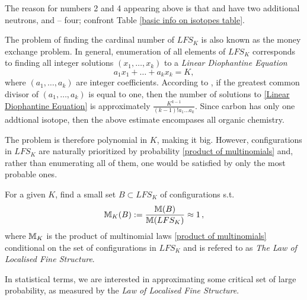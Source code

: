 The reason for numbers 2 and 4 appearing above is that  and  have two additional neutrons, and  -- four; confront Table \ref{basic info on isotopes table}.

The problem of finding the cardinal number of $LFS_K$ is also known as the money exchange problem. In general, enumeration of all elements of $LFS_K$ corresponds to finding all integer solutions $(x_1, \dots, x_k)$ to a {\it Linear Diophantine Equation}  
\begin{equation}\label{Linear Diophantine Equation}
	a_1 x_1 + \dots + a_k x_k = K,
\end{equation}
where $(a_1, \dots, a_k)$ are integer coefficients. According to \cite{Agnarsson2002OnTheSylvesterDenumerants}, if the greatest common divisor of $(a_1, \dots, a_k)$ is equal to one, then the number of solutions to \eqref{Linear Diophantine Equation} is approximately $\frac{K^{k-1}}{(k-1)! a_1 \dots a_k}$. Since carbon has only one addtional isotope, then the above estimate encompases all organic chemistry. 

The problem is therefore polynomial in $K$, making it big. However, configurations in $LFS_K$ are naturally prioritized by probability \eqref{product of multinomials} and, rather than enumerating all of them, one would be satisfied by only the most probable ones. 


\begin{Problem}\label{Problem of finding LFS_K configurations.}
	For a given $K$, find a small set $B \subset LFS_K$ of configurations s.t. 
	\begin{equation}\label{problem equation}
		\mathbb{M}_K (B) := \frac{ \mathbb{M}(B) }{ \mathbb{M}( LFS_K ) } \approx 1\,,	
	\end{equation} 
	where $\mathbb{M}_K$ is the product of multinomial laws \eqref{product of multinomials} conditional on the set of configurations in $LFS_K$ and is refered to as \emph{The Law of Localised Fine Structure}.
\end{Problem}


In statistical terms, we are interested in approximating some critical set of large probability, as measured by the {\it Law of Localised Fine Structure}. 


